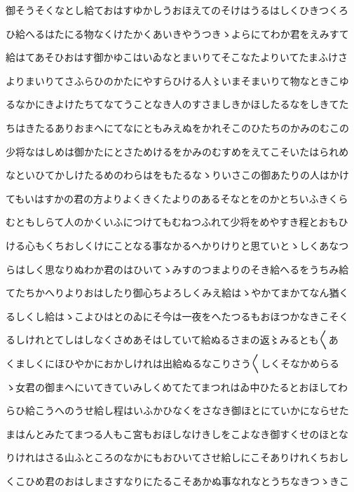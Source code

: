 \documentclass[a4paper,11pt,landscape]{ltjtarticle}
\begin{document}
御そうそくなとし給ておはすゆかしうおほえてのそけはうるはしくひきつくろ
\par\medskip
ひ給へるはたにる物なくけたかくあいきやうつきゝよらにてわか君をえみすて
\par\medskip
給はてあそひおはす御かゆこはいゐなとまいりてそこなたよりいてたまふけさ
\par\medskip
よりまいりてさふらひのかたにやすらひける人〻いまそまいりて物なときこゆ
\par\medskip
るなかにきよけたちてなてうことなき人のすさましきかほしたるなをしきてた
\par\medskip
ちはきたるありおまへにてなにともみえぬをかれそこのひたちのかみのむこの
\par\medskip
少将なはしめは御かたにとさためけるをかみのむすめをえてこそいたはられめ
\par\medskip
なといひてかしけたるめのわらはをもたるなゝりいさこの御あたりの人はかけ
\par\medskip
てもいはすかの君の方よりよくきくたよりのあるそなとをのかとちいふきくら
\par\medskip
むともしらて人のかくいふにつけてもむねつふれて少将をめやすき程とおもひ
\par\medskip
ける心もくちおしくけにことなる事なかるへかりけりと思ていとゝしくあなつ
\par\medskip
らはしく思なりぬわか君のはひいてゝみすのつまよりのそき給へるをうちみ給
\par\medskip
てたちかへりよりおはしたり御心ちよろしくみえ給はゝやかてまかてなん猶く
\par\medskip
るしくし給はゝこよひはとのゐにそ今は一夜をへたつるもおほつかなきこそく
\par\medskip
るしけれとてしはしなくさめあそはしていて給ぬるさまの返〻みるとも〱あ
\par\medskip
くましくにほひやかにおかしけれは出給ぬるなこりさう〱しくそなかめらる
\par\medskip
ゝ女君の御まへにいてきていみしくめてたてまつれはゐ中ひたるとおほしてわ
\par\medskip
らひ給こうへのうせ給し程はいふかひなくをさなき御ほとにていかにならせた
\par\medskip
まはんとみたてまつる人もこ宮もおほしなけきしをこよなき御すくせのほとな
\par\medskip
りけれはさる山ふところのなかにもおひいてさせ給しにこそありけれくちおし
\par\medskip
くこひめ君のおはしまさすなりにたるこそあかぬ事なれなとうちなきつゝきこ
\par\medskip
\end{document}
